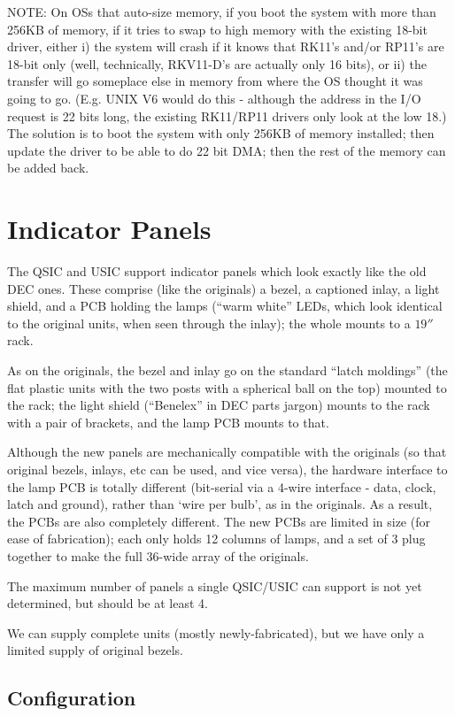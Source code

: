 NOTE: On OSs that auto-size memory, if you boot the system with more than
256KB of memory, if it tries to swap to high memory with the existing 18-bit
driver, either i) the system will crash if it knows that RK11's and/or RP11's
are 18-bit only (well, technically, RKV11-D's are actually only 16 bits), or
ii) the transfer will go someplace else in memory from where the OS thought
it was going to go. (E.g. UNIX V6 would do this - although the address in the
I/O request is 22 bits long, the existing RK11/RP11 drivers only look at the
low 18.) The solution is to boot the system with only 256KB of memory
installed; then update the driver to be able to do 22 bit DMA; then the rest
of the memory can be added back.

\chapter{Indicator Panels}

The QSIC and USIC support indicator panels which look exactly like the old
DEC ones. These comprise (like the originals) a bezel, a captioned inlay, a
light shield, and a PCB holding the lamps (``warm white'' LEDs, which look
identical to the original units, when seen through the inlay); the whole
mounts to a $19''$ rack.

As on the originals, the bezel and inlay go on the standard ``latch moldings''
(the flat plastic units with the two posts with a spherical ball on the top)
mounted to the rack; the light shield (``Benelex'' in DEC parts jargon) mounts
to the rack with a pair of brackets, and the lamp PCB mounts to that.

Although the new panels are mechanically compatible with the originals (so
that original bezels, inlays, etc can be used, and vice versa), the hardware
interface to the lamp PCB is totally different (bit-serial via a 4-wire
interface - data, clock, latch and ground), rather than `wire per bulb', as
in the originals. As a result, the PCBs are also completely different. The
new PCBs are limited in size (for ease of fabrication); each only holds 12
columns of lamps, and a set of 3 plug together to make the full 36-wide array
of the originals.

The maximum number of panels a single QSIC/USIC can support is not yet
determined, but should be at least 4.

We can supply complete units (mostly newly-fabricated), but we have only a
limited supply of original bezels.

\section{Configuration}

